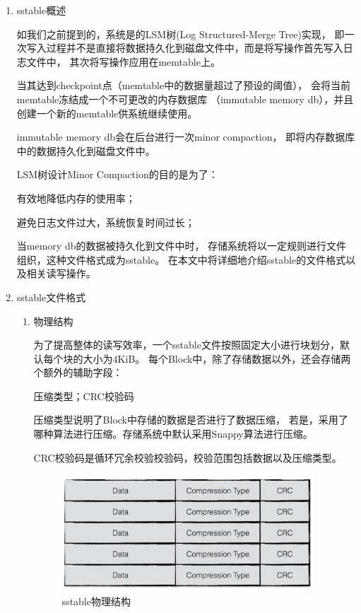 			\begin{enumerate}
				\item sstable概述
				
				如我们之前提到的，系统是的LSM树(Log Structured-Merge Tree)实现，
				即一次写入过程并不是直接将数据持久化到磁盘文件中，而是将写操作首先写入日志文件中，
				其次将写操作应用在memtable上。

				当其达到checkpoint点（memtable中的数据量超过了预设的阈值），
				会将当前memtable冻结成一个不可更改的内存数据库
				（immutable memory db），并且创建一个新的memtable供系统继续使用。

				immutable memory db会在后台进行一次minor compaction，
				即将内存数据库中的数据持久化到磁盘文件中。

				LSM树设计Minor Compaction的目的是为了：

				有效地降低内存的使用率；
				
				避免日志文件过大，系统恢复时间过长；
				
				当memory db的数据被持久化到文件中时，
				存储系统将以一定规则进行文件组织，这种文件格式成为sstable。
				在本文中将详细地介绍sstable的文件格式以及相关读写操作。

				\item sstable文件格式
				

				\begin{enumerate}
					\item 物理结构

					为了提高整体的读写效率，一个sstable文件按照固定大小进行块划分，默认每个块的大小为4KiB。
					每个Block中，除了存储数据以外，还会存储两个额外的辅助字段：
	
					压缩类型；CRC校验码
	
					压缩类型说明了Block中存储的数据是否进行了数据压缩，
					若是，采用了哪种算法进行压缩。存储系统中默认采用Snappy算法进行压缩。
	
					CRC校验码是循环冗余校验校验码，校验范围包括数据以及压缩类型。
					
					\begin{figure}[H]
						\centering
						\includegraphics[width=0.95\textwidth]{images/sstable_physic.jpeg}
						\caption{sstable物理结构}
						\label{sstable_physic}
					\end{figure}
					

\end{enumerate}
\end{enumerate}
